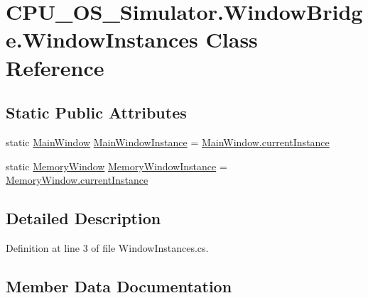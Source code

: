 \hypertarget{class_c_p_u___o_s___simulator_1_1_window_bridge_1_1_window_instances}{}\section{C\+P\+U\+\_\+\+O\+S\+\_\+\+Simulator.\+Window\+Bridge.\+Window\+Instances Class Reference}
\label{class_c_p_u___o_s___simulator_1_1_window_bridge_1_1_window_instances}
\subsection*{Static Public Attributes}
\begin{DoxyCompactItemize}
\item 
static \hyperlink{class_c_p_u___o_s___simulator_1_1_main_window}{Main\+Window} \hyperlink{class_c_p_u___o_s___simulator_1_1_window_bridge_1_1_window_instances_a130a2c32e8ccfd51a42ecb363fbb42cc}{Main\+Window\+Instance} = \hyperlink{class_c_p_u___o_s___simulator_1_1_main_window_a1280266cc57403a91f08a8350dee05cc}{Main\+Window.\+current\+Instance}
\item 
static \hyperlink{class_c_p_u___o_s___simulator_1_1_memory_window}{Memory\+Window} \hyperlink{class_c_p_u___o_s___simulator_1_1_window_bridge_1_1_window_instances_a401fd485bde830472a1a960a25ec1464}{Memory\+Window\+Instance} = \hyperlink{class_c_p_u___o_s___simulator_1_1_memory_window_a870b795e3b919a82888ad608ab24d61a}{Memory\+Window.\+current\+Instance}
\end{DoxyCompactItemize}


\subsection{Detailed Description}


Definition at line 3 of file Window\+Instances.\+cs.



\subsection{Member Data Documentation}
\hypertarget{class_c_p_u___o_s___simulator_1_1_window_bridge_1_1_window_instances_a130a2c32e8ccfd51a42ecb363fbb42cc}{}
